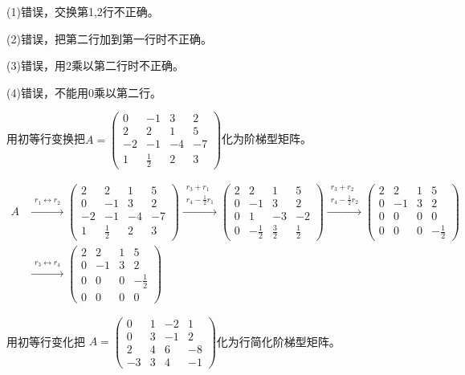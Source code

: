 \documentclass[a4paper]{report}
\begin{document}
\begin{jie}
(1)错误，交换第1,2行不正确。

(2)错误，把第二行加到第一行时不正确。

(3)错误，用2乘以第二行时不正确。

(4)错误，不能用0乘以第二行。
\end{jie}

\EX 用初等行变换把$
A=
\begin{pmatrix}
0&-1&3&2\\
2&2&1&5\\
-2&-1&-4&-7\\
1&\frac{1}{2}&2&3
\end{pmatrix}
$化为阶梯型矩阵。

\begin{jie}
\begin{align*}
A&\xrightarrow{\substack{r_{1}\leftrightarrow r_{2}}}
{
\begin{pmatrix}
2&2&1&5\\
0&-1&3&2\\
-2&-1&-4&-7\\
1&\frac{1}{2}&2&3
\end{pmatrix}
}
\xrightarrow{\substack{r_{3}+r_{1}\\ r_{4}-\frac{1}{2}r_{1}}}
{
\begin{pmatrix}
2&2&1&5\\
0&-1&3&2\\
0&1&-3&-2\\
0&-\frac{1}{2}&\frac{3}{2}&\frac{1}{2}
\end{pmatrix}
}\xrightarrow{\substack{r_{3}+r_{2}\\ r_{4}-\frac{1}{2}r_{2}}}
{
\begin{pmatrix}
2&2&1&5\\
0&-1&3&2\\
0&0&0&0\\
0&0&0&-\frac{1}{2}
\end{pmatrix}
}\\
&\xrightarrow{\substack{r_{3}\leftrightarrow r_{4}}}
{
\begin{pmatrix}
2&2&1&5\\
0&-1&3&2\\
0&0&0&-\frac{1}{2}\\
0&0&0&0
\end{pmatrix}
}\end{align*}
\end{jie}

\EX 用初等行变化把
$
A=
\begin{pmatrix}
0&1&-2&1\\
0&3&-1&2\\
2&4&6&-8\\
-3&3&4&-1
\end{pmatrix}
$化为行简化阶梯型矩阵。
\end{document}
